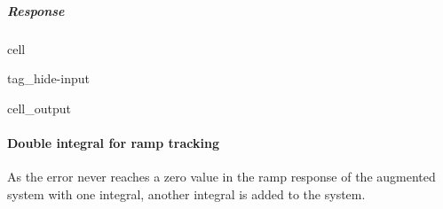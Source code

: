 \documentclass[letterpaper,10pt,english]{jupyterBook}
\begin{document}
\subparagraph{Response}
\label{\detokenize{ch/control/optimal-control-ref-tracking-example:response}}
\begin{sphinxuseclass}{cell}
\begin{sphinxuseclass}{tag_hide-input}\begin{sphinxVerbatimOutput}

\begin{sphinxuseclass}{cell_output}
\noindent{}

\noindent{}

\end{sphinxuseclass}\end{sphinxVerbatimOutput}

\end{sphinxuseclass}
\end{sphinxuseclass}

\paragraph{Double integral for ramp tracking}
\label{\detokenize{ch/control/optimal-control-ref-tracking-example:double-integral-for-ramp-tracking}}
\sphinxAtStartPar
As the error never reaches a zero value in the ramp response of the augmented system with one integral, another integral is added to the system.
\end{document}
